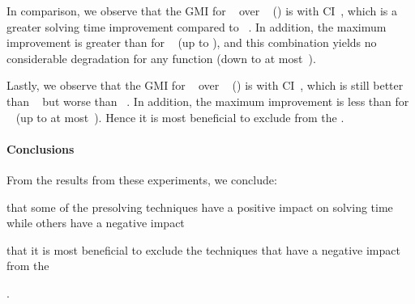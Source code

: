 In comparison, we observe that the \gls{GMI} for ~ over ~
() is \printGMI{%
  \SolvTechDisableBadPresolvingPrePlusSolvingTimeSpeedupPrePlusSolvingTimeRegularSpeedupGmean%
} with \gls{CI}~\printGMICI{%
  \SolvTechDisableBadPresolvingPrePlusSolvingTimeSpeedupPrePlusSolvingTimeRegularSpeedupCiMin%
}{%
  \SolvTechDisableBadPresolvingPrePlusSolvingTimeSpeedupPrePlusSolvingTimeRegularSpeedupCiMax%
}, which is a greater solving time improvement compared to ~.
%
In addition, the maximum improvement is greater than for ~ (up to
\printZCNorm{%
  \SolvTechDisableBadPresolvingPrePlusSolvingTimeSpeedupPrePlusSolvingTimeZeroCenteredSpeedupMax%
}), and this combination yields no considerable degradation for any
\gls{function} (down to at
most~\printZCNorm{%
  \SolvTechDisableBadPresolvingPrePlusSolvingTimeSpeedupPrePlusSolvingTimeZeroCenteredSpeedupMin%
}).

Lastly, we observe that the \gls{GMI} for ~ over ~
() is \printGMI{%
  \SolvTechDisableAllPresolvingPrePlusSolvingTimeSpeedupPrePlusSolvingTimeRegularSpeedupGmean%
} with \gls{CI}~\printGMICI{%
  \SolvTechDisableAllPresolvingPrePlusSolvingTimeSpeedupPrePlusSolvingTimeRegularSpeedupCiMin%
}{%
  \SolvTechDisableAllPresolvingPrePlusSolvingTimeSpeedupPrePlusSolvingTimeRegularSpeedupCiMax%
}, which is still better than ~ but worse than ~.
%
In addition, the maximum improvement is less than for ~ (up to at
most~\printZCNorm{%
  \SolvTechDisableAllPresolvingPrePlusSolvingTimeSpeedupPrePlusSolvingTimeZeroCenteredSpeedupMax%
}).
%
Hence it is most beneficial to exclude
 from the
.


\paragraph{Conclusions}

From the results from these experiments, we conclude:
%
\begin{enumerate*}[label=(\roman*), itemjoin={;\ }, itemjoin*={; and\ }]
  \item that some of the \gls{presolving} techniques have a positive impact on
    solving time while others have a negative impact
  \item that it is most beneficial to exclude the techniques that have a
    negative impact from the 
\end{enumerate*}.


